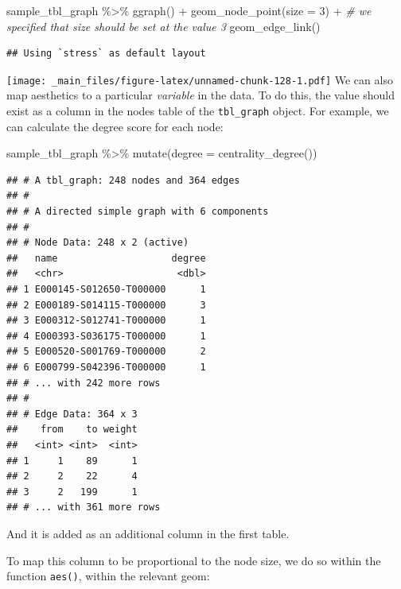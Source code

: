 \documentclass[
]{book}
\newenvironment{Shaded}{\begin{snugshade}}{\end{snugshade}}
\newcommand{\AttributeTok}[1]{\textcolor[rgb]{0.77,0.63,0.00}{#1}}
\newcommand{\CommentTok}[1]{\textcolor[rgb]{0.56,0.35,0.01}{\textit{#1}}}
\newcommand{\DecValTok}[1]{\textcolor[rgb]{0.00,0.00,0.81}{#1}}
\newcommand{\FunctionTok}[1]{\textcolor[rgb]{0.00,0.00,0.00}{#1}}
\newcommand{\NormalTok}[1]{#1}
\newcommand{\SpecialCharTok}[1]{\textcolor[rgb]{0.00,0.00,0.00}{#1}}
\begin{document}
\begin{Shaded}
\begin{Highlighting}[]
\NormalTok{sample\_tbl\_graph }\SpecialCharTok{\%\textgreater{}\%} 
  \FunctionTok{ggraph}\NormalTok{() }\SpecialCharTok{+} 
  \FunctionTok{geom\_node\_point}\NormalTok{(}\AttributeTok{size =} \DecValTok{3}\NormalTok{) }\SpecialCharTok{+} \CommentTok{\# we specified that size should be set at the value 3}
  \FunctionTok{geom\_edge\_link}\NormalTok{()}
\end{Highlighting}
\end{Shaded}

\begin{verbatim}
## Using `stress` as default layout
\end{verbatim}

\texttt{[image: \_main\_files/figure-latex/unnamed-chunk-128-1.pdf]}
We can also map aesthetics to a particular \emph{variable} in the data. To do this, the value should exist as a column in the nodes table of the \texttt{tbl\_graph} object. For example, we can calculate the degree score for each node:

\begin{Shaded}
\begin{Highlighting}[]
\NormalTok{sample\_tbl\_graph }\SpecialCharTok{\%\textgreater{}\%} 
  \FunctionTok{mutate}\NormalTok{(}\AttributeTok{degree =} \FunctionTok{centrality\_degree}\NormalTok{()) }
\end{Highlighting}
\end{Shaded}

\begin{verbatim}
## # A tbl_graph: 248 nodes and 364 edges
## #
## # A directed simple graph with 6 components
## #
## # Node Data: 248 x 2 (active)
##   name                    degree
##   <chr>                    <dbl>
## 1 E000145-S012650-T000000      1
## 2 E000189-S014115-T000000      3
## 3 E000312-S012741-T000000      1
## 4 E000393-S036175-T000000      1
## 5 E000520-S001769-T000000      2
## 6 E000799-S042396-T000000      1
## # ... with 242 more rows
## #
## # Edge Data: 364 x 3
##    from    to weight
##   <int> <int>  <int>
## 1     1    89      1
## 2     2    22      4
## 3     2   199      1
## # ... with 361 more rows
\end{verbatim}

And it is added as an additional column in the first table.

To map this column to be proportional to the node size, we do so within the function \texttt{aes()}, within the relevant geom:
\end{document}
